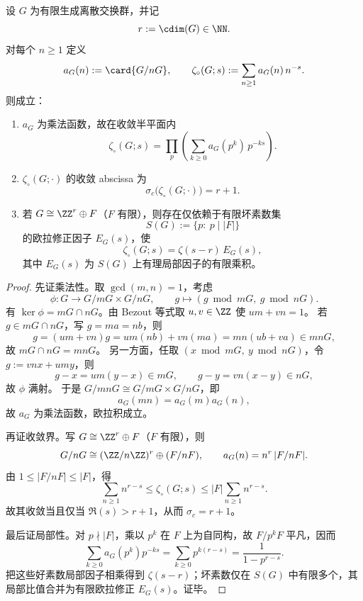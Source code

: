 \begin{theorem}\label{thm:xi-cdim-zeta-euler-abscissa-locality}
设 \(G\) 为有限生成离散交换群，并记
\[
r:=\cdim(G)\in\NN.
\]
对每个 \(n\ge 1\) 定义
\[
a_G(n):=\card{G/nG},
\qquad
\zeta_{\circ}(G;s):=\sum_{n\ge 1}a_G(n)\,n^{-s}.
\]
则成立：
\begin{enumerate}
  \item \(a_G\) 为乘法函数，故在收敛半平面内
  \[
  \zeta_{\circ}(G;s)=\prod_{p}\left(\sum_{k\ge 0}a_G(p^k)\,p^{-ks}\right).
  \]
  \item \(\zeta_{\circ}(G;\cdot)\) 的收敛 abscissa 为
  \[
  \sigma_c\!\bigl(\zeta_{\circ}(G;\cdot)\bigr)=r+1.
  \]
  \item 若 \(G\cong \ZZ^r\oplus F\)（\(F\) 有限），则存在仅依赖于有限坏素数集
  \[
  S(G):=\{p:\ p\mid |F|\}
  \]
  的欧拉修正因子 \(E_G(s)\)，使
  \[
  \zeta_{\circ}(G;s)=\zeta(s-r)\,E_G(s),
  \]
  其中 \(E_G(s)\) 为 \(S(G)\) 上有理局部因子的有限乘积。
\end{enumerate}
\end{theorem}
\begin{proof}
先证乘法性。取 \(\gcd(m,n)=1\)，考虑
\[
\phi:G\to G/mG\times G/nG,\qquad g\mapsto (g\bmod mG,\ g\bmod nG).
\]
有 \(\ker\phi=mG\cap nG\)。由 Bezout 等式取 \(u,v\in\ZZ\) 使 \(um+vn=1\)。
若 \(g\in mG\cap nG\)，写 \(g=ma=nb\)，则
\[
g=(um+vn)g=um(nb)+vn(ma)=mn(ub+va)\in mnG,
\]
故 \(mG\cap nG=mnG\)。
另一方面，任取 \((x\bmod mG,\ y\bmod nG)\)，令 \(g:=vnx+umy\)，则
\[
g-x=um(y-x)\in mG,\qquad g-y=vn(x-y)\in nG,
\]
故 \(\phi\) 满射。
于是 \(G/mnG\cong G/mG\times G/nG\)，即
\[
a_G(mn)=a_G(m)a_G(n),
\]
故 \(a_G\) 为乘法函数，欧拉积成立。

再证收敛界。写 \(G\cong \ZZ^r\oplus F\)（\(F\) 有限），则
\[
G/nG\cong (\ZZ/n\ZZ)^r\oplus (F/nF),
\qquad
a_G(n)=n^r\,|F/nF|.
\]
由 \(1\le |F/nF|\le |F|\)，得
\[
\sum_{n\ge 1}n^{r-s}
\le
\zeta_{\circ}(G;s)
\le
|F|\sum_{n\ge 1}n^{r-s}.
\]
故其收敛当且仅当 \(\Re(s)>r+1\)，从而 \(\sigma_c=r+1\)。

最后证局部性。对 \(p\nmid |F|\)，乘以 \(p^k\) 在 \(F\) 上为自同构，故 \(F/p^kF\) 平凡，因而
\[
\sum_{k\ge 0}a_G(p^k)p^{-ks}
=
\sum_{k\ge 0}p^{k(r-s)}
=
\frac{1}{1-p^{r-s}}.
\]
把这些好素数局部因子相乘得到 \(\zeta(s-r)\)；坏素数仅在 \(S(G)\) 中有限多个，其局部比值合并为有限欧拉修正 \(E_G(s)\)。证毕。
\end{proof}




